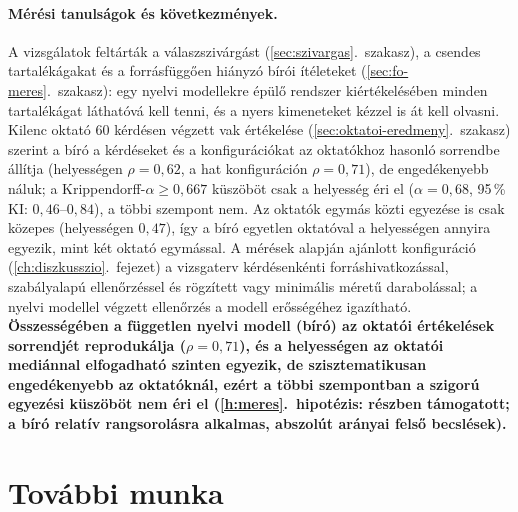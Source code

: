 \paragraph{Mérési tanulságok és következmények.} A vizsgálatok feltárták a válaszszivárgást
(\ref{sec:szivargas}.~szakasz), a csendes tartalékágakat és a forrásfüggően hiányzó bírói ítéleteket
(\ref{sec:fo-meres}.~szakasz): egy nyelvi modellekre épülő rendszer kiértékelésében minden tartalékágat
láthatóvá kell tenni, és a nyers kimeneteket kézzel is át kell olvasni. Kilenc oktató 60 kérdésen végzett
vak értékelése (\ref{sec:oktatoi-eredmeny}.~szakasz) szerint a bíró a kérdéseket és a konfigurációkat az
oktatókhoz hasonló sorrendbe állítja (helyességen $\rho=0{,}62$, a hat konfiguráción $\rho=0{,}71$), de
engedékenyebb náluk; a Krippendorff-$\alpha\ge0{,}667$ küszöböt csak a helyesség éri el ($\alpha=0{,}68$,
95\,\% KI: $0{,}46$--$0{,}84$), a többi szempont nem. Az oktatók egymás közti egyezése is csak közepes
(helyességen $0{,}47$), így a bíró egyetlen oktatóval a helyességen annyira egyezik, mint két oktató
egymással. A
mérések alapján ajánlott konfiguráció (\ref{ch:diszkusszio}.~fejezet) a vizsgaterv kérdésenkénti
forráshivatkozással, szabályalapú ellenőrzéssel és rögzített vagy minimális méretű darabolással; a nyelvi
modellel végzett ellenőrzés a modell erősségéhez igazítható. \textbf{Összességében a független nyelvi modell
(bíró) az oktatói értékelések sorrendjét reprodukálja ($\rho=0{,}71$), és a helyességen az oktatói
mediánnal elfogadható szinten egyezik, de szisztematikusan engedékenyebb az oktatóknál, ezért a többi
szempontban a szigorú egyezési küszöböt nem éri el (\ref{h:meres}.~hipotézis: részben támogatott; a bíró
relatív rangsorolásra alkalmas, abszolút arányai felső becslések).}

\section{További munka}

